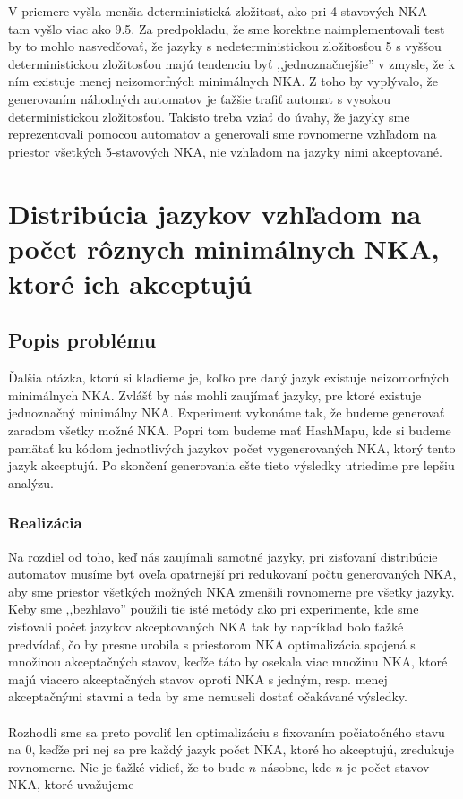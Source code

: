 V priemere vyšla menšia deterministická zložitosť, ako pri 4-stavových NKA - tam vyšlo viac ako 9.5. Za predpokladu, že sme korektne naimplementovali test by to mohlo nasvedčovať, že jazyky s nedeterministickou zložitosťou 5 s vyššou deterministickou zložitosťou majú tendenciu byť ,,jednoznačnejšie'' v zmysle, že k ním existuje menej neizomorfných minimálnych NKA. Z toho by vyplývalo, že generovaním náhodných automatov je ťažšie trafiť automat s vysokou deterministickou zložitosťou. Takisto treba vziať do úvahy, že jazyky sme reprezentovali pomocou automatov a generovali sme rovnomerne vzhľadom na priestor všetkých 5-stavových NKA, nie vzhľadom na jazyky nimi akceptované.

\section{Distribúcia jazykov vzhľadom na počet rôznych minimálnych NKA, ktoré ich akceptujú}

\subsection{Popis problému}
Ďalšia otázka, ktorú si kladieme je, koľko pre daný jazyk existuje neizomorfných minimálnych NKA. Zvlášť by nás mohli zaujímať jazyky, pre ktoré existuje jednoznačný minimálny NKA. Experiment vykonáme tak, že budeme generovať zaradom všetky možné NKA. Popri tom budeme mať HashMapu, kde si budeme pamätať ku kódom jednotlivých jazykov počet vygenerovaných NKA, ktorý tento jazyk akceptujú. Po skončení generovania ešte tieto výsledky utriedime pre lepšiu analýzu.

\subsubsection{Realizácia}
Na rozdiel od toho, keď nás zaujímali samotné jazyky, pri zisťovaní distribúcie automatov musíme byť oveľa opatrnejší pri redukovaní počtu generovaných NKA, aby sme priestor všetkých možných NKA zmenšili rovnomerne pre všetky jazyky. Keby sme ,,bezhlavo'' použili tie isté metódy ako pri experimente, kde sme zisťovali počet jazykov akceptovaných NKA tak by napríklad bolo ťažké predvídať, čo by presne urobila s priestorom NKA optimalizácia spojená s množinou akceptačných stavov, keďže táto by osekala viac množinu NKA, ktoré majú viacero akceptačných stavov oproti NKA s jedným, resp. menej akceptačnými stavmi a teda by sme nemuseli dostať očakávané výsledky. 
\paragraph{}
Rozhodli sme sa preto povoliť len optimalizáciu s fixovaním počiatočného stavu na 0, keďže pri nej sa pre každý jazyk počet NKA, ktoré ho akceptujú, zredukuje rovnomerne. Nie je ťažké vidieť, že to bude $n$-násobne, kde $n$ je počet stavov NKA, ktoré uvažujeme

